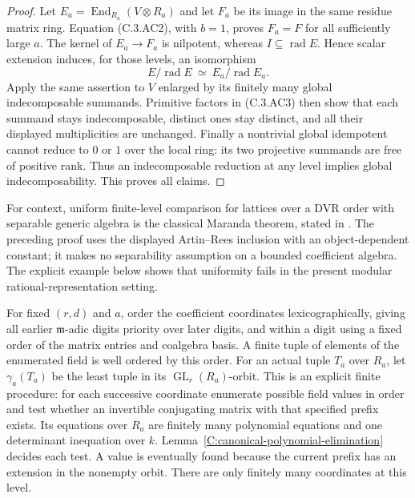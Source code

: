 \begin{proof}
Let $E_a=\operatorname{End}_{R_a}(V\otimes R_a)$ and let
$F_a$ be its image in the same residue matrix ring.  Equation
(C.3.AC2), with $b=1$, proves $F_a=F$ for all sufficiently
large $a$.  The kernel of $E_a\to F_a$ is nilpotent, whereas
$I\subseteq\operatorname{rad}E$.  Hence scalar extension
induces, for those levels, an isomorphism
\[
       E/\operatorname{rad}E
          \ \simeq\ E_a/\operatorname{rad}E_a.          \tag{C.3.AC3}
\]
Apply the same assertion to $V$ enlarged by its finitely many
global indecomposable summands.  Primitive factors in (C.3.AC3)
then show that each summand stays indecomposable, distinct ones
stay distinct, and all their displayed multiplicities are
unchanged.  Finally a nontrivial global idempotent cannot reduce
to $0$ or $1$ over the local ring: its two projective summands
are free of positive rank.  Thus an indecomposable reduction at
any level implies global indecomposability.  This proves all claims.
\end{proof}

For context, uniform finite-level comparison for lattices over
a DVR order with separable generic algebra is the classical
Maranda theorem, stated in
\cite[Introduction, pp.\ 1--2]{C-CompleteMarandaContext}.
The preceding proof uses the displayed Artin--Rees inclusion
with an object-dependent constant; it makes no separability
assumption on a bounded coefficient algebra.  The explicit
example below shows that uniformity fails in the present
modular rational-representation setting.

For fixed $(r,d)$ and $a$, order the coefficient coordinates
lexicographically, giving all earlier $\mathfrak m$-adic digits
priority over later digits, and within a digit using a fixed order
of the matrix entries and coalgebra basis.  A finite tuple of
elements of the enumerated field is well ordered by this order.
For an actual tuple $T_a$ over $R_a$, let $\gamma_a(T_a)$ be
the least tuple in its $\operatorname{GL}_r(R_a)$-orbit.
This is an explicit finite procedure: for each successive
coordinate enumerate possible field values in order and test
whether an invertible conjugating matrix with that specified
prefix exists.  Its equations over $R_a$ are finitely many
polynomial equations and one determinant inequation over $k$.
Lemma~\ref{C:canonical-polynomial-elimination} decides each test.
A value is eventually found because the current prefix has an
extension in the nonempty orbit.  There are only finitely many
coordinates at this level.


